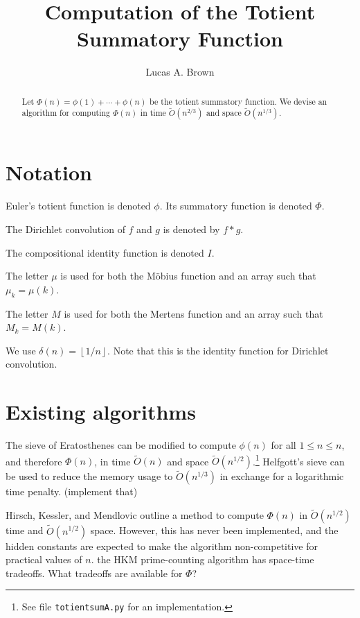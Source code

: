 \documentclass[12pt]{article}
\title{Computation of the Totient Summatory Function}
\author{Lucas A. Brown}
\date{\currentdatetime}
\newcommand{\floor}[1]{{\left\lfloor #1 \right\rfloor}}
\newcommand{\softO}[0]{\widetilde{O}}
\begin{document}
\maketitle %

\begin{abstract}
Let $\Phi(n) = \phi(1) + \cdots + \phi(n)$ be the totient summatory function.  We devise an algorithm for computing $\Phi(n)$ in time $\softO(n^{2/3})$ and space $\softO(n^{1/3})$.
\end{abstract}

\section{Notation}

Euler's totient function is denoted $\phi$.  Its summatory function is denoted $\Phi$.

The Dirichlet convolution of $f$ and $g$ is denoted by $f*g$.

The compositional identity function is denoted $I$.

The letter $\mu$ is used for both the M\"{o}bius function and an array such that $\mu_k = \mu(k)$.

The letter $M$ is used for both the Mertens function and an array such that $M_k = M(k)$.

We use $\delta(n) = \floor{1/n}$.  Note that this is the identity function for Dirichlet convolution.

\section{Existing algorithms}

The sieve of Eratosthenes can be modified to compute $\phi(n)$ for all $1 \leq n \leq n$, and therefore $\Phi(n)$, in time $\softO(n)$ and space $\softO(n^{1/2})$.\footnote{See file \texttt{totientsumA.py} for an implementation.}  Helfgott's sieve \cite{Helfgott2020} can be used to reduce the memory usage to $\softO(n^{1/3})$ in exchange for a logarithmic time penalty.  (\todo implement that)

Hirsch, Kessler, and Mendlovic outline \cite[\S5.6]{HKM2024} a method to compute $\Phi(n)$ in $\softO(n^{1/2})$ time and $\softO(n^{1/2})$ space.  However, this has never been implemented, and the hidden constants are expected to make the algorithm non-competitive for practical values of $n$.  \todo the HKM prime-counting algorithm has space-time tradeoffs.  What tradeoffs are available for $\Phi$?
\end{document}
